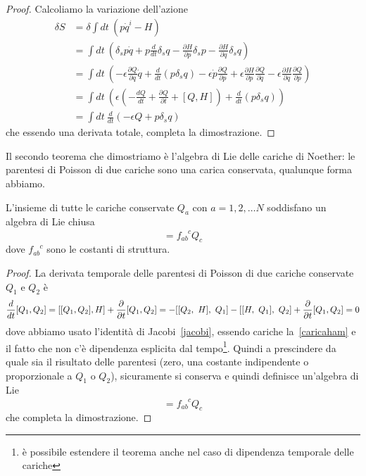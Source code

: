     \begin{proof}
        Calcoliamo la variazione dell'azione
    \begin{equation*}
    \begin{aligned}
        \delta S & = \delta \int dt ~ (p \dot q^i - H) \\ & = \int dt ~  (\delta_s p \dot q + p \frac{d}{dt} \delta_s q - \frac{\partial H}{\partial p} \delta_s p - \frac{\partial H}{\partial q} \delta_s q) \\ & = \int dt ~ (- \epsilon \frac{\partial Q}{\partial q} \dot q + \frac{d}{dt} (p \delta_s q) - \epsilon \dot p \frac{\partial Q}{\partial p} + \epsilon \frac{\partial H}{\partial p} \frac{\partial Q}{\partial q} - \epsilon \frac{\partial H}{\partial q}\frac{\partial Q}{\partial p}) \\ & = \int dt ~ (\epsilon (- \frac{dQ}{dt} + \frac{\partial Q}{\partial t} + [Q, H] ) + \frac{d}{dt} (p \delta_s q)) \\ & = \int dt ~ \frac{d}{dt}(-\epsilon Q + p \delta_s q)
    \end{aligned}
    \end{equation*}
        che essendo una derivata totale, completa la dimostrazione.
    \end{proof}

    Il secondo teorema che dimostriamo è l'algebra di Lie delle cariche di Noether: le parentesi di Poisson di due cariche sono una carica conservata, qualunque forma abbiamo.

    \begin{theorem}
        L'insieme di tutte le cariche conservate $Q_a$ con $a = 1, 2, \ldots N$ soddisfano un algebra di Lie chiusa
    \begin{equation*}
        [Q_a, Q_b] = f_{ab}^{\phantom{ab}c} Q_c
    \end{equation*}
        dove $f_{ab}^{\phantom{ab}c}$ sono le costanti di struttura.
    \end{theorem}

    \begin{proof}
        La derivata temporale delle parentesi di Poisson di due cariche conservate $Q_1$ e $Q_2$ è
    \begin{equation*}
        \frac{d}{dt} [Q_1, Q_2] = [[Q_1, Q_2], H] + \frac{\partial}{\partial t} [Q_1, Q_2] = - [[Q_2, ~H], ~Q_1] - [[H, ~Q_1], ~Q_2] + \frac{\partial}{\partial t} [Q_1, Q_2] = 0
    \end{equation*} 
        dove abbiamo usato l'identità di Jacobi~\eqref{jacobi}, essendo cariche la~\eqref{caricaham} e il fatto che non c'è dipendenza esplicita dal tempo\footnote{è possibile estendere il teorema anche nel caso di dipendenza temporale delle cariche}. Quindi a prescindere da quale sia il risultato delle parentesi (zero, una costante indipendente o proporzionale a $Q_1$ o $Q_2$), sicuramente si conserva e quindi definisce un'algebra di Lie
    \begin{equation*}
        [Q_a, Q_b] = f_{ab}^{\phantom{ab}c} Q_c
    \end{equation*}
        che completa la dimostrazione.
    \end{proof}

